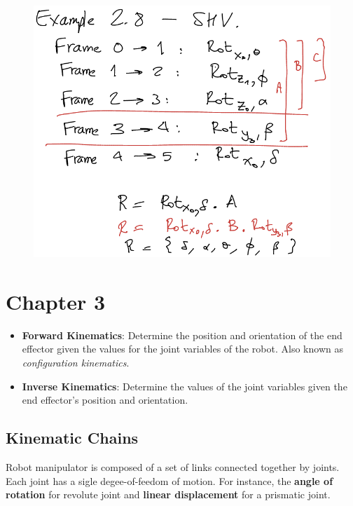 \documentclass[a4paper,10pt,twocolumn]{article}
\begin{document}
\begin{figure}[H]
\centering
 \includegraphics[width=.8\linewidth]{rotatiodecomposition.png}
\end{figure}


\section*{Chapter 3}

\begin{itemize}
 \item \textbf{Forward Kinematics}: Determine the position and orientation of the end effector given the values for the joint variables of the robot. Also known as \textit{configuration kinematics}.
 \item \textbf{Inverse Kinematics}: Determine the values of the joint variables given the end effector's position and orientation.
\end{itemize}

\subsection*{Kinematic Chains}

Robot manipulator is composed of a set of links connected together by joints. Each joint has a sigle degee-of-feedom of motion. For instance, the \textbf{angle of rotation} for revolute joint and \textbf{linear displacement} for a prismatic joint.
\end{document}
